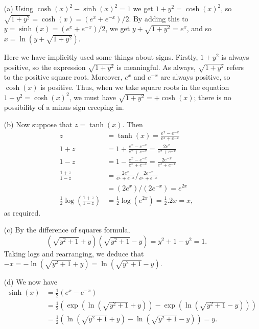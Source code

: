 \documentclass[a4paper]{amsart}
\theoremstyle{definition}
\newenvironment{solution}{{\noindent \bf Solution:}}{}
\begin{document}
\begin{solution}
\begin{itemize}
  \item[(a)] Using $\cosh(x)^2-\sinh(x)^2=1$ we get
   $1+y^2=\cosh(x)^2$, so
   $\sqrt{1+y^2}=\cosh(x)=(e^x+e^{-x})/2$.  By adding this to
   $y=\sinh(x)=(e^x+e^{-x})/2$, we get $y+\sqrt{1+y^2}=e^x$,
   and so $x=\ln(y+\sqrt{1+y^2})$.

   Here we have implicitly used some things about signs.
   Firstly, $1+y^2$ is always positive, so the expression
   $\sqrt{1+y^2}$ is meaningful.  As always, $\sqrt{1+y^2}$
   refers to the positive square root.  Moreover, $e^x$ and
   $e^{-x}$ are always positive, so $\cosh(x)$ is positive.
   Thus, when we take square roots in the equation
   $1+y^2=\cosh(x)^2$, we must have $\sqrt{1+y^2}=+\cosh(x)$;
   there is no possibility of a minus sign creeping in.
  \item[(b)] Now suppose that $z=\tanh(x)$.  Then
    \begin{align*}
     z &= \tanh(x) = \frac{e^x-e^{-x}}{e^x+e^{-x}} \\
     1+z &= 1 + \frac{e^x-e^{-x}}{e^x+e^{-x}} = \frac{2e^x}{e^x+e^{-x}} \\
     1-z &= 1 - \frac{e^x-e^{-x}}{e^x+e^{-x}} = \frac{2e^{-x}}{e^x+e^{-x}} \\
     \frac{1+z}{1-z} &= \frac{2e^x}{e^x+e^{-x}} / \frac{2e^{-x}}{e^x+e^{-x}} \\
                     &= (2e^x)/(2e^{-x}) = e^{2x} \\
     \frac{1}{2}\log\left(\frac{1+z}{1-z}\right) &=
       \frac{1}{2} \log(e^{2x}) = \frac{1}{2}.2x = x,
    \end{align*}
  as required.
  \item[(c)] By the difference of squares formula,
   \[ (\sqrt{y^2+1}+y)(\sqrt{y^2+1}-y)=y^2+1-y^2=1. \]
   Taking logs and rearranging, we deduce that 
   $-x=-\ln(\sqrt{y^2+1}+y)=\ln(\sqrt{y^2+1}-y)$. 
  \item[(d)] We now have 
   \begin{align*}
    \sinh(x) &= \frac{1}{2}(e^x-e^{-x}) \\
     &= \frac{1}{2}\left(\exp(\ln(\sqrt{y^2+1}+y)) - 
                         \exp(\ln(\sqrt{y^2+1}-y))\right) \\
     &= \frac{1}{2}\left(\ln(\sqrt{y^2+1}+y)-
                         \ln(\sqrt{y^2+1}-y)\right) = y.
   \end{align*}
 \end{itemize}
\end{solution}
\end{document}
